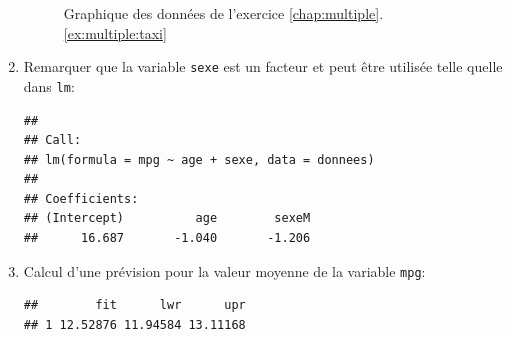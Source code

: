 \begin{solution}{3.18}
\begin{enumerate}
\begin{figure}
\begin{knitrout}
\end{knitrout}
        \caption{Graphique des données de l'exercice
          \ref{chap:multiple}.\ref{ex:multiple:taxi}}
        \label{fig:multiple:taxi}
      \end{figure}
    \item Remarquer que la variable \texttt{sexe} est un facteur et peut
      être utilisée telle quelle dans \texttt{lm}:
\begin{knitrout}
\color{fgcolor}\begin{kframe}
\begin{alltt}
 \hlkwb{<-}  \hlopt{~}  \hlopt{+}   
\end{alltt}
\begin{verbatim}
##
## Call:
## lm(formula = mpg ~ age + sexe, data = donnees)
##
## Coefficients:
## (Intercept)          age        sexeM
##      16.687       -1.040       -1.206
\end{verbatim}
\end{kframe}
\end{knitrout}
    \item Calcul d'une prévision pour la valeur moyenne de la variable
      \texttt{mpg}:
\begin{knitrout}
\color{fgcolor}\begin{kframe}
\begin{alltt}
  \hlstd{=} \hlstd{(} \hlstd{=} \hlstd{,}  \hlstd{=} \hlstd{),}
         \hlstd{=} \hlstd{,}  \hlstd{=} \hlstd{)}
\end{alltt}
\begin{verbatim}
##        fit      lwr      upr
## 1 12.52876 11.94584 13.11168
\end{verbatim}
\end{kframe}
\end{knitrout}
    \end{enumerate}
  
\end{solution}
